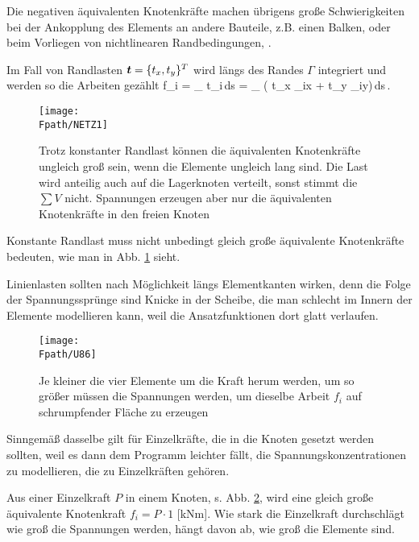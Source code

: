 {Die negativen \"{a}quivalenten Knotenkr\"{a}fte machen \"{u}brigens gro{\ss}e Schwierigkeiten bei der Ankopplung des Elements an andere Bauteile, z.B. einen Balken, oder beim Vorliegen von nichtlinearen Randbedingungen, \cite{Katz2}.

Im Fall von Randlasten $\mbox{\boldmath $t$} = \{t_x,t_y\}^T$ wird l\"{a}ngs des Randes $\Gamma$ integriert und werden so die Arbeiten gez\"{a}hlt
\bfo
f_i = \int_{\Gamma} \vek t\dotprod \vek \Np_i\,ds = \int_{\Gamma} ( t_x \cdot \Np_{ix} + t_y \cdot \Np_{iy})\,ds\,.
\efo
\begin{figure}[tbp] \centering
\if {} \sidecaption \fi
\texttt{[image: \\Fpath/NETZ1]}
\caption{Trotz konstanter Randlast k\"{o}nnen die \"{a}quivalenten Knotenkr\"{a}fte ungleich gro{\ss}
sein, wenn die Elemente ungleich lang sind. Die Last wird anteilig auch auf die
Lagerknoten verteilt, sonst stimmt die $\sum V$ nicht. Spannungen erzeugen aber nur die
\"{a}quivalenten Knotenkr\"{a}fte in den freien Knoten} \label{NETZ1}
\end{figure}%
Konstante Randlast muss nicht unbedingt gleich gro{\ss}e \"{a}quivalente Knotenkr\"{a}fte bedeuten, wie man in Abb. \ref{NETZ1} sieht.

Linienlasten sollten nach M\"{o}glichkeit l\"{a}ngs Elementkanten wirken, denn die Folge der Spannungsspr\"{u}nge sind Knicke in der Scheibe, die man schlecht im Innern der Elemente modellieren kann, weil die Ansatzfunktionen dort glatt verlaufen.
\begin{figure}
\centering
\if {} \sidecaption[t] \fi
{\texttt{[image: \\Fpath/U86]}}
\caption{Je kleiner die vier Elemente um die Kraft herum werden, um so gr\"{o}{\ss}er m\"{u}ssen die Spannungen werden, um dieselbe Arbeit $f_i$ auf schrumpfender Fl\"{a}che zu erzeugen}
\label{U86}%
\end{figure}%

Sinngem\"{a}{\ss} dasselbe gilt f\"{u}r Einzelkr\"{a}fte, die in die Knoten gesetzt werden sollten, weil es dann dem Programm leichter f\"{a}llt, die Spannungskonzentrationen zu modellieren, die zu Einzelkr\"{a}ften geh\"{o}ren.

Aus einer Einzelkraft $ P$ in einem Knoten, s. Abb. \ref{U86}, wird eine gleich gro{\ss}e \"{a}quivalente Knotenkraft $f_i = P \cdot 1$\,\,[kNm]. Wie stark die Einzelkraft \glq durchschl\"{a}gt\grq\, wie gro{\ss} die Spannungen werden, h\"{a}ngt davon ab, wie gro{\ss} die Elemente sind.

}
